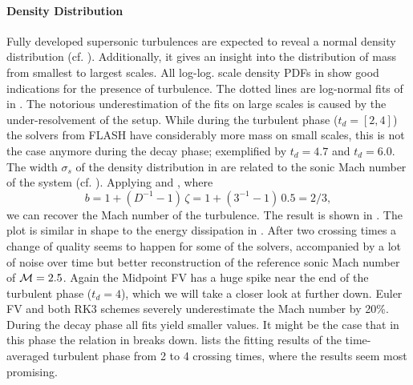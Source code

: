 \paragraph{Density Distribution}
Fully developed supersonic turbulences are expected to reveal a normal
density distribution (cf. ). Additionally, it gives
an insight into the distribution of mass from smallest to largest scales.
All log-log. scale density PDFs in 
show good indications for the presence of turbulence. The dotted lines are
log-normal fits of  in . The notorious
underestimation of the fits on large scales is caused by the under-resolvement
of the setup. While during the turbulent phase
($t_d = [2,4]$) the solvers from FLASH have considerably more mass on small
scales, this is not the case anymore during the decay phase; exemplified by
$t_d = 4.7$ and $t_d = 6.0$.
The width $\sigma_s$ of the density distribution in
 are related to the sonic Mach
number of the system (cf. ). Applying
 and , where
\begin{equation}
b = 1 + (D^{-1} - 1) \, \zeta = 1 + (3^{-1} - 1) \, 0.5 = 2/3,
\end{equation}
we can recover the Mach number of the turbulence. The result is shown in
. The plot is similar in shape to
the energy dissipation in .
After two crossing times a change of quality seems to happen for some of the
solvers, accompanied by a lot of noise over time but better reconstruction of
the reference sonic Mach number of $\mathcal{M} = 2.5$. Again the Midpoint FV has a
huge spike near the end of the turbulent  phase ($t_d = 4$), which we will take
a closer look at further down. Euler FV and both RK3 schemes severely
underestimate the Mach number by 20\%. During the decay phase all fits yield
smaller values. It might be the case that in this phase the relation in
 breaks down.  lists the fitting results
of the time-averaged turbulent phase from 2 to 4 crossing times, where the
results seem most promising.

